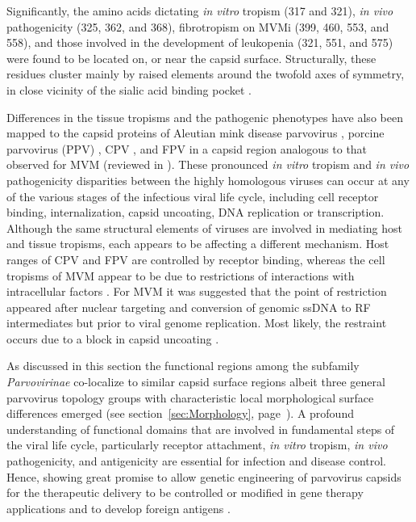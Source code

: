 	
	Significantly, the amino acids dictating \textit{in vitro} tropism (317 and 321), \textit{in vivo} pathogenicity (325, 362, and 368), fibrotropism on MVMi (399, 460, 553, and 558), and those involved in the development of leukopenia (321, 551, and 575) were found to be located on, or near the capsid surface. Structurally, these residues cluster mainly by raised elements around the twofold axes of symmetry, in close vicinity of the sialic acid binding pocket \cite{pmid16415031, pmid18045943}.   
	
Differences in the tissue tropisms and the pathogenic phenotypes  have also been mapped to the capsid proteins of Aleutian mink disease parvovirus \cite{pmid8396664}, porcine parvovirus (PPV)  \cite{pmid8642680}, CPV \cite{pmid3176341, pmid1331498}, and FPV \cite{pmid7513918} in a capsid region analogous to that observed for MVM (reviewed in \cite{tropism}). These pronounced \textit{in vitro} tropism and \textit{in vivo} pathogenicity disparities between the highly homologous viruses can occur at any of the various stages of the infectious viral life cycle, including cell receptor binding, internalization, capsid uncoating, DNA replication or transcription. Although the same structural elements of viruses are involved in mediating host and tissue tropisms, each appears to be affecting a different mechanism. Host ranges of CPV and FPV are controlled by receptor binding, whereas the cell tropisms of MVM appear to be due to restrictions of interactions with intracellular factors \cite{pmid9817841, pmid12941411, pmid6602221}. For MVM it was suggested that the point of restriction appeared after nuclear targeting and conversion of genomic ssDNA to RF intermediates but prior to viral genome replication. Most likely, the restraint occurs due to a block in capsid uncoating \cite{pmid9311862, pmid1322591}.

As discussed in this section the functional regions among the subfamily \textit{Parvovirinae} co-localize to similar capsid surface regions albeit three general parvovirus topology groups with characteristic local morphological surface differences emerged (see section~\ref{sec:Morphology}, page~\pageref{sec:Morphology}). A profound understanding of functional domains that are involved in fundamental steps of the viral life cycle, particularly receptor attachment, \textit{in vitro} tropism, \textit{in vivo} pathogenicity, and antigenicity are essential for infection and disease control. Hence, showing great promise to allow genetic engineering of parvovirus capsids for the therapeutic delivery to be controlled or modified in gene therapy applications and to develop foreign antigens \cite{pmid12941411, tropism}.     



